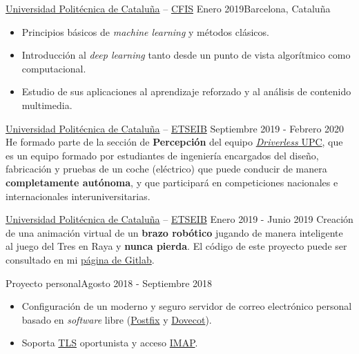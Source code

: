 \documentclass[10pt, a4paper, ragged2e]{altacv}
\begin{document}
{\href{https://upc.edu}{Universidad Politécnica de Cataluña} --
  \href{https://cfis.upc.edu}{CFIS}}
{Enero 2019}{Barcelona, Cataluña}
\begin{itemize}
  \item Principios básicos de \textit{machine learning} y métodos clásicos.
  \item Introducción al \textit{deep learning} tanto desde un punto de vista
  algorítmico como computacional.
  \item Estudio de sus aplicaciones al aprendizaje reforzado y al análisis de
  contenido multimedia.
\end{itemize}


\clearpage


{\href{https://upc.edu}{Universidad Politécnica de Cataluña} --
\href{https://etseib.upc.edu}{ETSEIB}}
{Septiembre 2019 - Febrero 2020}{}
He formado parte de la sección de \textbf{Percepción} del equipo
\href{https://driverless.upc.edu}{\textit{Driverless} UPC}, que es un equipo
formado por estudiantes de ingeniería encargados del diseño, fabricación y
pruebas de un coche (eléctrico) que puede conducir de manera \textbf{completamente
autónoma}, y que participará en competiciones nacionales e internacionales
interuniversitarias.

\divider

{\href{https://upc.edu}{Universidad Politécnica de Cataluña} --
\href{https://etseib.upc.edu}{ETSEIB}}
{Enero 2019 - Junio 2019}{}
Creación de una animación virtual de un \textbf{brazo robótico} jugando de
manera inteligente al juego del Tres en Raya y \textbf{nunca pierda}. El código
de este proyecto puede ser consultado en mi
\href{https://gitlab.com/DavidAlvarez}{página de Gitlab\footnotemark}.

\divider

{Proyecto personal}{Agosto 2018 - Septiembre 2018}{}
\begin{itemize}
  \item Configuración de un moderno y seguro servidor de correo electrónico
  personal basado en \textit{software} libre
  (\href{http://www.postfix.org/}{Postfix} y
  \href{https://www.dovecot.org/}{Dovecot}).
  \item Soporta \href{https://es.wikipedia.org/wiki/Transport_Layer_Security}{TLS}
  oportunista y acceso
  \href{https://es.wikipedia.org/wiki/Protocolo_de_acceso_a_mensajes_de_Internet}
  {IMAP}.
\end{itemize}
\end{document}
